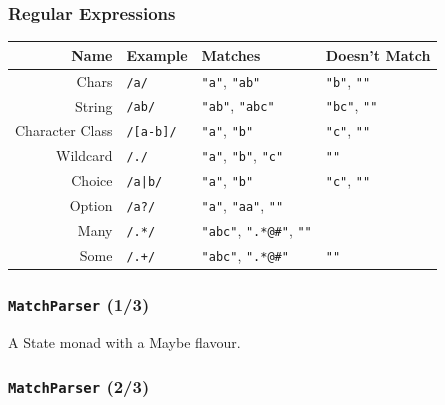 \begin{frame}

\frametitle{Regular Expressions}

\footnotesize

\vspace{\fill}

\begin{center}

\begin{tabular}{rlll}
\textbf{Name} & \textbf{Example} & \textbf{Matches} & \textbf{Doesn't Match} \\\hline
Chars & \texttt{/a/} & \texttt{"a"}, \texttt{"ab"} & \texttt{"b"}, \texttt{""} \\
String & \texttt{/ab/} & \texttt{"ab"}, \texttt{"abc"} & \texttt{"bc"}, \texttt{""} \\
Character Class & \texttt{/[a-b]/} & \texttt{"a"}, \texttt{"b"} & \texttt{"c"}, \texttt{""} \\
Wildcard & \texttt{/./} & \texttt{"a"}, \texttt{"b"}, \texttt{"c"} & \texttt{""} \\
Choice & \texttt{/a|b/} & \texttt{"a"}, \texttt{"b"} & \texttt{"c"}, \texttt{""} \\
Option & \texttt{/a?/} & \texttt{"a"}, \texttt{"aa"}, \texttt{""} & \\
Many & \texttt{/.*/} & \texttt{"abc"}, \texttt{".*@\#"}, \texttt{""} & \\
Some & \texttt{/.+/} & \texttt{"abc"}, \texttt{".*@\#"} & \texttt{""}
\end{tabular}

\end{center}

\vspace{\fill}

\end{frame}


\begin{frame}

\frametitle{\texttt{MatchParser} (1/3)}



\begin{center}

A State monad with a Maybe flavour.

\end{center}

\end{frame}


\begin{frame}

\frametitle{\texttt{MatchParser} (2/3)}



\end{frame}


